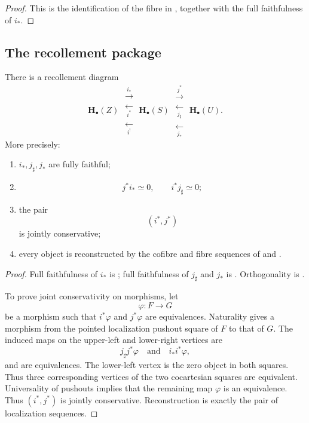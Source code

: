 \begin{proof}
This is the identification of the fibre in
, together with the full
faithfulness of \(i_*\).
\end{proof}

\subsection{The recollement package}

\begin{theorem}
\label{thm:closed-open-recollement}
There is a recollement diagram
\[
    \mathbf H_\bullet(Z)
    \;
    \substack{
        \xrightarrow{\ i_*\ }
        \\
        \xleftarrow[\ i^*\ ]{}
        \\
        \xleftarrow[\ i^!\ ]{}
    }
    \;
    \mathbf H_\bullet(S)
    \;
    \substack{
        \xrightarrow{\ j^*\ }
        \\
        \xleftarrow[\ j_\sharp\ ]{}
        \\
        \xleftarrow[\ j_*\ ]{}
    }
    \;
    \mathbf H_\bullet(U).
\]
More precisely:
\begin{enumerate}[label=(\roman*)]
    \item \(i_*,j_\sharp,j_*\) are fully faithful;

    \item
    \[
        j^*i_*
        \simeq
        0,
        \qquad
        i^*j_\sharp
        \simeq
        0;
    \]

    \item the pair
    \[
        (i^*,j^*)
    \]
    is jointly conservative;

    \item every object is reconstructed by the cofibre and fibre
    sequences of
    and
    .
\end{enumerate}
\end{theorem}

\begin{proof}
Full faithfulness of \(i_*\) is
; full faithfulness of \(j_\sharp\)
and \(j_*\) is .
Orthogonality is .

To prove joint conservativity on morphisms, let
\[
    \varphi
    \colon
    F
    \longrightarrow
    G
\]
be a morphism such that \(i^*\varphi\) and \(j^*\varphi\) are
equivalences.  Naturality gives a morphism from the pointed
localization pushout square of \(F\) to that of \(G\).  The induced maps
on the upper-left and lower-right vertices are
\[
    j_\sharp j^*\varphi
    \quad\text{and}\quad
    i_*i^*\varphi,
\]
and are equivalences.  The lower-left vertex is the zero object in both
squares.  Thus three corresponding vertices of the two cocartesian
squares are equivalent.  Universality of pushouts implies that the
remaining map \(\varphi\) is an equivalence.  Thus \((i^*,j^*)\) is
jointly conservative.  Reconstruction is exactly the pair of
localization sequences.
\end{proof}


